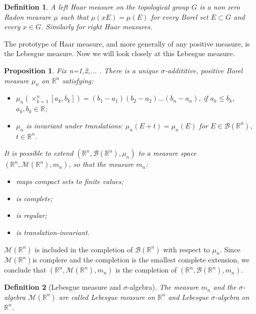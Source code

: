 \documentclass[10pt]{book}
\theoremstyle{break}
\newtheorem{proposition}{Proposition}
\newtheorem{definition}{Definition}
\begin{document}
\begin{definition}
A left Haar measure on the topological group $G$ is a non zero Radon measure $\mu$ such that $\mu(xE)=\mu(E)$ for every Borel set $E\subset G$ and every $x\in G$. Similarly for right Haar measures.
\end{definition}


The prototype of Haar measure, and more generally of any positive measure, is the Lebesgue measure. Now we will look closely at this Lebesgue measure.


\begin{proposition}
Fix n=1,2,... . There is a unique $\sigma$-addititive, positive Borel measure $\mu_n$ on $\mathbb{R}^n$ satisfying:
\begin{itemize}
\item $\mu_n ( \times_{k=1}^{n} [a_k,b_k] ) = (b_1 - a_1)(b_2 - a_2) ... (b_n - a_n) $, if $a_k \leq b_k$, $a_k, b_k \in \mathbb{R}$;
\item $\mu_n$ is invariant under translations: $\mu_n (E + t) = \mu_n (E)$ for $E \in \mathcal{B}(\mathbb{R}^n)$, $t \in \mathbb{R}^n$.
\end{itemize}
It is possible to extend $(\mathbb{R}^{n},\mathcal{B}(\mathbb{R}^n),\mu_n)$ to a measure space $(\mathbb{R}^{n},\mathcal{M}(\mathbb{R}^{n}),m_n)$, so that the measure $m_n$: 
\begin{itemize}
\item maps compact sets to finite values;
\item is complete;
\item is regular;
\item is translation-invariant.
\end{itemize}
\end{proposition}


$\mathcal{M}(\mathbb{R}^{n})$ is included in the completion of $\mathcal{B}(\mathbb{R}^n)$ with respect to $\mu_n$. Since $\mathcal{M}(\mathbb{R}^{n})$is complere and the completion is the smallest complete extension, we conclude that $(\mathbb{R}^{n},\mathcal{M}(\mathbb{R}^{n}),m_n)$ is the completion of  $(\mathbb{R}^{n},\mathcal{B}(\mathbb{R}^{n}),m_n)$.


\begin{definition}[Lebesgue measure and $\sigma$-algebra]
The measure $m_n$ and the $\sigma$-algebra $\mathcal{M}(\mathbb{R}^{n})$ are called Lebesgue measure on $\mathbb{R}^{n}$ and Lebesgue $\sigma$-algebra on $\mathbb{R}^{n}$.
\end{definition}
\end{document}
